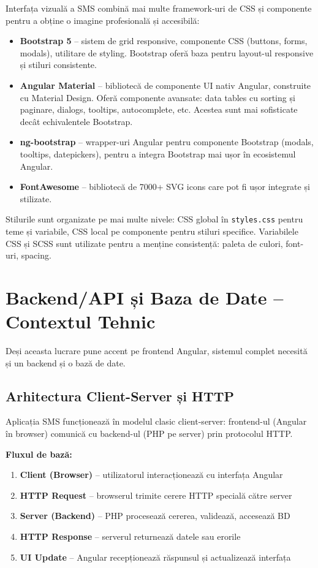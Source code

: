 Interfața vizuală a SMS combină mai multe framework-uri de CSS și componente pentru a obține o imagine profesională și accesibilă:

\begin{itemize}
  \item \textbf{Bootstrap 5} – sistem de grid responsive, componente CSS (buttons, forms, modals), utilitare de styling. Bootstrap oferă baza pentru layout-ul responsive și stiluri consistente.
  \item \textbf{Angular Material} – bibliotecă de componente UI nativ Angular, construite cu Material Design. Oferă componente avansate: data tables cu sorting și paginare, dialogs, tooltips, autocomplete, etc. Acestea sunt mai sofisticate decât echivalentele Bootstrap.
  \item \textbf{ng-bootstrap} – wrapper-uri Angular pentru componente Bootstrap (modals, tooltips, datepickers), pentru a integra Bootstrap mai ușor în ecosistemul Angular.
  \item \textbf{FontAwesome} – bibliotecă de 7000+ SVG icons care pot fi ușor integrate și stilizate.
\end{itemize}

Stilurile sunt organizate pe mai multe nivele: CSS global în \texttt{styles.css} pentru teme și variabile, CSS local pe componente pentru stiluri specifice. Variabilele CSS și SCSS sunt utilizate pentru a menține consistență: paleta de culori, font-uri, spacing.

\section{Backend/API și Baza de Date – Contextul Tehnic}

Deși aceasta lucrare pune accent pe frontend Angular, sistemul complet necesită și un backend și o bază de date.

\subsection{Arhitectura Client-Server și HTTP}

Aplicația SMS funcționează în modelul clasic client-server: frontend-ul (Angular în browser) comunică cu backend-ul (PHP pe server) prin protocolul HTTP.

\textbf{Fluxul de bază:}

\begin{enumerate}
  \item \textbf{Client (Browser)} – utilizatorul interacționează cu interfața Angular
  \item \textbf{HTTP Request} – browserul trimite cerere HTTP specială către server
  \item \textbf{Server (Backend)} – PHP procesează cererea, validează, accesează BD
  \item \textbf{HTTP Response} – serverul returnează datele sau erorile
  \item \textbf{UI Update} – Angular recepționează răspunsul și actualizează interfața
\end{enumerate}

